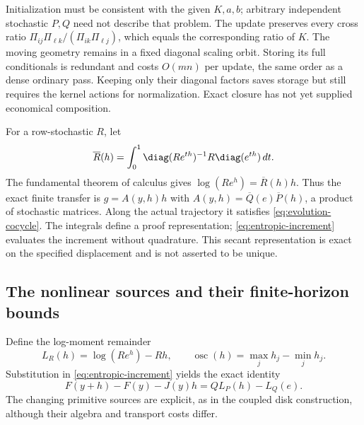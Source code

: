 Initialization must be consistent with the given $K,a,b$; arbitrary
independent stochastic $P,Q$ need not describe that problem. The update
preserves every cross ratio
$\Pi_{ij}\Pi_{\ell k}/(\Pi_{ik}\Pi_{\ell j})$, which equals the
corresponding ratio of $K$. The moving geometry remains in a fixed diagonal
scaling orbit. Storing its full conditionals is redundant and costs
$O(mn)$ per update, the same order as a dense ordinary pass. Keeping only
their diagonal factors saves storage but still requires the kernel actions
for normalization. Exact closure has not yet supplied economical composition.

For a row-stochastic $R$, let
\[
 \overline R(h)=\int_0^1
   \diag(Re^{th})^{-1}R\diag(e^{th})\,dt.
\]
The fundamental theorem of calculus gives
$\log(Re^h)=\overline R(h)h$. Thus the exact finite transfer is
$g=A(y,h)h$ with $A(y,h)=\overline Q(e)\overline P(h)$, a product of
stochastic matrices. Along the actual trajectory it satisfies
\eqref{eq:evolution-cocycle}. The integrals define a proof representation;
\eqref{eq:entropic-increment} evaluates the increment without quadrature.
This secant representation is exact on the specified displacement and
is not asserted to be unique.

\subsection{The nonlinear sources and their finite-horizon bounds}
Define the log-moment remainder
\[
 L_R(h)=\log(Re^h)-Rh,\qquad
 \operatorname{osc}(h)=\max_j h_j-\min_j h_j.
\]
Substitution in \eqref{eq:entropic-increment} yields the exact identity
\begin{equation}
 F(y+h)-F(y)-J(y)h=Q L_P(h)-L_Q(e).
 \label{eq:entropic-sources}
\end{equation}
The changing primitive sources are explicit, as in the coupled disk
construction, although their algebra and transport costs differ.

